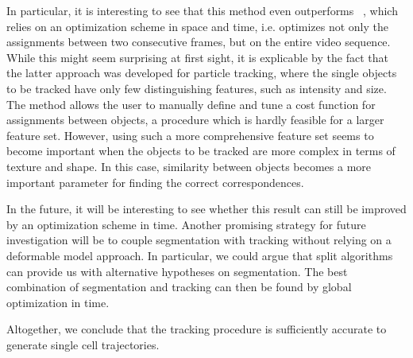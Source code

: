 In particular, it is interesting to see that this method even outperforms
~\cite{jaqaman}, which relies on an optimization scheme in space and
time, i.e. optimizes not only the assignments between two consecutive
frames, but on the entire video sequence. While this might seem
surprising at first sight, it is explicable by the fact that the
latter approach was developed for particle tracking, where the single
objects to be tracked have only few distinguishing features, such as
intensity and size. The
method allows the user to manually define and tune a cost function for
assignments between objects, a procedure which is hardly feasible for
a larger feature set. However, using such a more comprehensive feature
set seems to become important when the objects to be tracked are more
complex in terms of texture and shape. In this case, similarity
between objects becomes a more important parameter for finding the
correct correspondences. 



In the future, it will be interesting to see whether this result can
still be improved by an optimization scheme in time. Another promising
strategy for future investigation will be to couple segmentation
with tracking without relying on a deformable model approach. In
particular, we could argue that split algorithms can provide us with
alternative hypotheses on segmentation. The best combination of
segmentation and tracking can then be found by global optimization in
time. 

Altogether, we conclude that the tracking procedure is sufficiently
accurate to generate single cell trajectories. 




